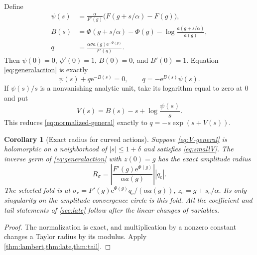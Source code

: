 \documentclass[11pt,a4paper]{article}
\numberwithin{equation}{section}
\newtheorem{corollary}[corollary]{Corollary}
\theoremstyle{definition}
\theoremstyle{remark}
\newcommand{\e}{\mathrm e}
\newcommand{\scv}{s_{\mathrm c}}
\newcommand{\qcv}{q_{\mathrm c}}
\begin{document}
Define
\begin{align}
 \psi(s)&=\frac{\alpha}{F'(g)}
       \bigl(F(g+s/\alpha)-F(g)\bigr),\label{eq:psi-general}\\
 B(s)&=\Phi(g+s/\alpha)-\Phi(g)
       -\log\frac{a(g+s/\alpha)}{a(g)},\label{eq:B-general}\\
 q&=\frac{\alpha\sigma a(g)\e^{-\Phi(g)}}{F'(g)}.
 \label{eq:q-general}
\end{align}
Then $\psi(0)=0$, $\psi'(0)=1$, $B(0)=0$, and $B'(0)=1$. Equation \eqref{eq:generalaction} is exactly
\begin{equation}
 \psi(s)+q\e^{-B(s)}=0,
 \qquad q=-\e^{B(s)}\psi(s).
 \label{eq:normalized-general}
\end{equation}
If $\psi(s)/s$ is a nonvanishing analytic unit, take its logarithm equal to zero at $0$ and put
\begin{equation}
 V(s)=B(s)-s+\log\frac{\psi(s)}s.
 \label{eq:V-general}
\end{equation}
This reduces \eqref{eq:normalized-general} exactly to $q=-s\exp(s+V(s))$.

\begin{corollary}[Exact radius for curved actions]
\label{cor:curved}
Suppose \eqref{eq:V-general} is holomorphic on a neighborhood of $|s|\leq1+\delta$ and satisfies \eqref{eq:smallV}. The inverse germ of \eqref{eq:generalaction} with $z(0)=g$ has the exact amplitude radius
\begin{equation}
 R_\sigma=
 \left|\frac{F'(g)\e^{\Phi(g)}}{\alpha a(g)}\right||\qcv|.
 \label{eq:radius-sigma}
\end{equation}
The selected fold is at
$\sigma_{\mathrm c}=F'(g)\e^{\Phi(g)}\qcv/(\alpha a(g))$,
$z_{\mathrm c}=g+\scv/\alpha$.
Its only singularity on the amplitude convergence circle is this fold. All the coefficient and tail statements of \cref{sec:late} follow after the linear changes of variables.
\end{corollary}
\begin{proof}
The normalization is exact, and multiplication by a nonzero constant changes a Taylor radius by its modulus. Apply \cref{thm:lambert,thm:late,thm:tail}.
\end{proof}
\end{document}

